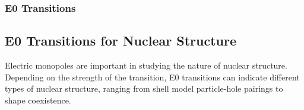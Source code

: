 
\subsubsection{E0 Transitions}


\subsection{E0 Transitions for Nuclear Structure}

Electric monopoles are important in studying the nature of nuclear structure. Depending on the strength of the transition, E0 transitions can indicate different types of nuclear structure, ranging from shell model particle-hole pairings to shape coexistence. 


%
% 
% 